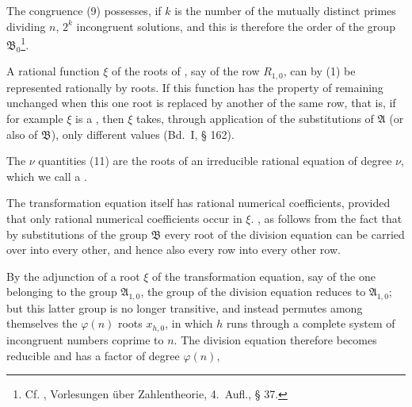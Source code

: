 
The congruence (9) possesses, if $k$ is the number of the mutually distinct primes dividing $n$,
$2^k$ incongruent solutions, and this is therefore the order of the group
$\mathfrak{B}_0$\footnote{Cf. , Vorlesungen über Zahlentheorie, 4.\ Aufl., § 37.}.

A rational function $\xi$ of the roots of , say of the row $R_{1,0}$, can by (1) be
represented rationally by  roots. If this function has the property of remaining
unchanged when this one root is replaced by another of the same row, that is, if for example
$\xi$ is a , then $\xi$ takes, through application of
the substitutions of $\mathfrak{A}$ (or also of $\mathfrak{B}$), only
different values
 (Bd.\ I, § 162).

The $\nu$ quantities (11) are the roots of an irreducible rational equation of degree $\nu$,
which we call a .

The transformation equation itself has rational numerical coefficients, provided that only
rational numerical coefficients occur in $\xi$. , as follows from the fact that by
substitutions of the group $\mathfrak{B}$ every root of the division equation can be carried
over into every other, and hence also every row into every other row.

By the adjunction of a root $\xi$ of the transformation equation, say of the one belonging to
the group $\mathfrak{A}_{1,0}$, the group of the division equation reduces to
$\mathfrak{A}_{1,0}$; but this latter group is no longer transitive, and instead permutes among
themselves the $\varphi(n)$ roots $x_{h,0}$, in which $h$ runs through a complete system of
incongruent numbers coprime to $n$. The division equation therefore becomes reducible and has a
factor of degree $\varphi(n)$,
